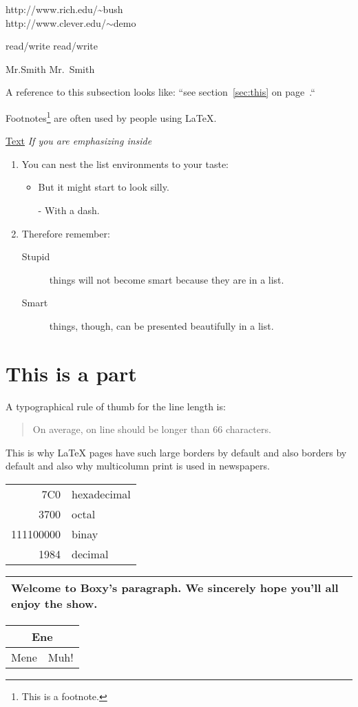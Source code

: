 \documentclass[11pt,twoside,a4paper]{article}
\begin{document}
http://www.rich.edu/\~{}bush \\
http://www.clever.edu/$\sim$demo

read/write
read\slash write

Mr.Smith
Mr.~Smith

A reference to this subsection
\label{sec:this} looks like:
``see section~\ref{sec:this} on
page~\pageref{sec:this}.``

Footnotes\footnote{This is a footnote.} are often used by people using
\LaTeX.

\underline{Text}
\emph{If you are emphasizing inside}

\flushleft
\begin{enumerate}
    \item You can nest the list environments to your taste:
        \begin{itemize}
            \item But it might start to look silly.
            \item[-] With a dash.
        \end{itemize}
    \item Therefore remember:
        \begin{description}
            \item[Stupid] things will not become smart because they are
                in a list.
            \item[Smart] things, though,
                can be presented beautifully in a list.
        \end{description}
\end{enumerate}

\part{This is a part}
A typographical rule of thumb for the line length is:
\begin{quote}
    On average, on line should
    be longer than 66 characters.
\end{quote}
This is why \LaTeX{} pages have such large borders by default
and also  borders by default and also why multicolumn print
is used in newspapers.

\begin{tabular}{|r|l|}
    \hline
    7C0 & hexadecimal \\
    3700 & octal \\ \cline{2-2}
    111100000 & binay \\
    \hline \hline
    1984 & decimal \\
    \hline
\end{tabular}

\begin{tabular}{|p{4.7cm}|}
    \hline
    Welcome to Boxy's paragraph.
    We sincerely hope you'll
    all enjoy the show.\\
    \hline
\end{tabular}

\begin{tabular}{|c|c|}
    \hline
    \multicolumn{2}{|c|}{Ene} \\
    \hline
    Mene & Muh! \\
    \hline
\end{tabular}
\end{document}
